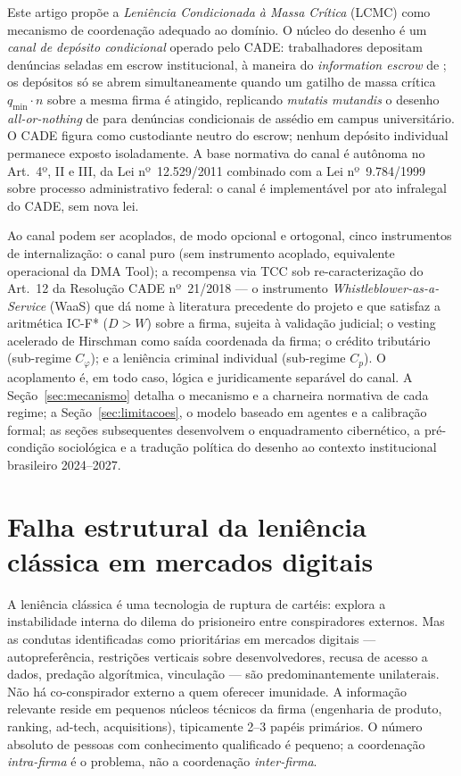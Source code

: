 \documentclass[12pt,a4paper]{article}
\begin{document}
Este artigo propõe a \emph{Leniência Condicionada à Massa Crítica} (LCMC) como mecanismo de coordenação adequado ao domínio. O núcleo do desenho é um \emph{canal de depósito condicional} operado pelo CADE: trabalhadores depositam denúncias seladas em escrow institucional, à maneira do \emph{information escrow} de \citet{ayres2012information}; os depósitos só se abrem simultaneamente quando um gatilho de massa crítica $q_{\min}\cdot n$ sobre a mesma firma é atingido, replicando \emph{mutatis mutandis} o desenho \emph{all-or-nothing} de \citet{callisto} para denúncias condicionais de assédio em campus universitário. O CADE figura como custodiante neutro do escrow; nenhum depósito individual permanece exposto isoladamente. A base normativa do canal é autônoma no Art.~4º, II e III, da Lei nº~12.529/2011 \citep{lei12529} combinado com a Lei nº~9.784/1999 \citep{lei9784} sobre processo administrativo federal: o canal é implementável por ato infralegal do CADE, sem nova lei.

Ao canal podem ser acoplados, de modo opcional e ortogonal, cinco instrumentos de internalização: o canal puro (sem instrumento acoplado, equivalente operacional da DMA Tool); a recompensa via TCC sob re-caracterização do Art.~12 da Resolução CADE nº~21/2018 \citep{res21cade} --- o instrumento \emph{Whistleblower-as-a-Service} (WaaS) que dá nome à literatura precedente do projeto e que satisfaz a aritmética IC-F* ($D > W$) sobre a firma, sujeita à validação judicial; o vesting acelerado de Hirschman como saída coordenada da firma; o crédito tributário (sub-regime $C_\varphi$); e a leniência criminal individual (sub-regime $C_p$). O acoplamento é, em todo caso, lógica e juridicamente separável do canal. A Seção~\ref{sec:mecanismo} detalha o mecanismo e a charneira normativa de cada regime; a Seção~\ref{sec:limitacoes}, o modelo baseado em agentes e a calibração formal; as seções subsequentes desenvolvem o enquadramento cibernético, a pré-condição sociológica e a tradução política do desenho ao contexto institucional brasileiro 2024--2027.

\section{Falha estrutural da leniência clássica em mercados digitais}

A leniência clássica é uma tecnologia de ruptura de cartéis: explora a instabilidade
interna do dilema do prisioneiro entre conspiradores externos. Mas as condutas
identificadas como prioritárias em mercados digitais \citep{cremer2019competition}
--- autopreferência, restrições verticais sobre desenvolvedores, recusa de acesso a
dados, predação algorítmica, vinculação --- são predominantemente unilaterais. Não
há co-conspirador externo a quem oferecer imunidade. A informação relevante reside
em pequenos núcleos técnicos da firma (engenharia de produto, ranking, ad-tech,
acquisitions), tipicamente 2--3 papéis primários. O número absoluto de pessoas com
conhecimento qualificado é pequeno; a coordenação \emph{intra-firma} é o problema,
não a coordenação \emph{inter-firma}.
\end{document}
